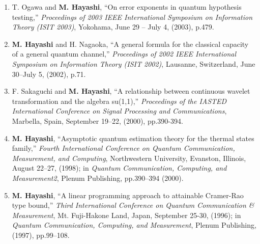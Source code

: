 \documentclass[a4paper,12pt,oneside]{article}
\begin{document}
\begin{enumerate}
\item
T. Ogawa and \textbf{M. Hayashi}, ``On error exponents in quantum hypothesis testing,'' 
{\em Proceedings of 2003 IEEE International Symposium on Information Theory (ISIT 2003)}, 
Yokohama, June 29 -- July 4, (2003), p.479.

\item
\textbf{M. Hayashi} and H. Nagaoka, ``A general formula for the classical capacity of a general quantum channel,'' 
{\em Proceedings of 2002 IEEE International Symposium on Information Theory (ISIT 2002)}, 
Lausanne, Switzerland, June 30--July 5, (2002), p.71.

\item
F. Sakaguchi and \textbf{M. Hayashi}, ``A relationship between continuous wavelet transformation and the algebra su(1,1),'' 
{\em Proceedings of the IASTED International Conference on Signal Processing and Communications}, Marbella, Spain, September 19--22, (2000), pp.390-394.
\item
\textbf{M. Hayashi}, ``Asymptotic quantum estimation theory for the thermal states family,'' 
{\em Fourth International Conference on 
Quantum Communication, Measurement, and Computing}, 
Northwestern University, Evanston, Illinois,  August 22--27, (1998);
in {\em Quantum Communication, Computing, and Measurement2}, Plenum Publishing, pp.390--394 (2000).

\item
\textbf{M. Hayashi}, ``A linear programming approach to attainable Cramer-Rao type bound,'' 
{\em Third International Conference on Quantum Communication \& Measurement}, 
Mt. Fuji-Hakone Land, Japan, September 25-30, (1996);
in {\em Quantum Communication, Computing, and Measurement}, Plenum Publishing, (1997), 
pp.99--108.
\end{enumerate}
\end{document}
